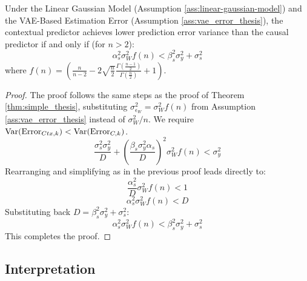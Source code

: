 \documentclass[../thesis.tex]{subfiles}
\begin{document}
\begin{theorem}
\label{thm:vae_thesis}
Under the Linear Gaussian Model (Assumption \ref{ass:linear-gaussian-model}) and the VAE-Based Estimation Error (Assumption \ref{ass:vae_error_thesis}), the contextual predictor achieves lower prediction error variance than the causal predictor if and only if (for $n>2$):
\[ \alpha_s^2 \sigma_W^2 f(n) < \beta_s^2 \sigma_y^2 + \sigma_s^2 \]
where $f(n) = \left( \frac{n}{n-2} - 2 \sqrt{\frac{n}{2}} \frac{\Gamma(\frac{n-1}{2})}{\Gamma(\frac{n}{2})} + 1 \right)$.
\end{theorem}

\begin{proof}
The proof follows the same steps as the proof of Theorem \ref{thm:simple_thesis}, substituting $\sigma_{\epsilon_W}^2 = \sigma_W^2 f(n)$ from Assumption \ref{ass:vae_error_thesis} instead of $\sigma_W^2/n$.
We require $\mathrm{Var}(\text{Error}_{Ctx,k}) < \mathrm{Var}(\text{Error}_{C,k})$.
\[ \frac{\sigma_s^2 \sigma_y^2}{D} + \left(\frac{\beta_s \sigma_y^2 \alpha_s}{D}\right)^2 \sigma_W^2 f(n) < \sigma_y^2 \]
Rearranging and simplifying as in the previous proof leads directly to:
\[ \frac{\alpha_s^2}{D} \sigma_W^2 f(n) < 1 \]
\[ \alpha_s^2 \sigma_W^2 f(n) < D \]
Substituting back $D = \beta_s^2 \sigma_y^2 + \sigma_s^2$:
\[ \alpha_s^2 \sigma_W^2 f(n) < \beta_s^2 \sigma_y^2 + \sigma_s^2 \]
This completes the proof.
\end{proof}

\subsection{Interpretation}
\end{document}
